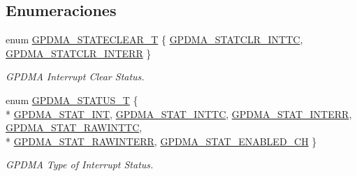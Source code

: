 \subsection*{Enumeraciones}
\begin{DoxyCompactItemize}
\item 
enum \hyperlink{group___g_p_d_m_a__18_x_x__43_x_x_gabbb281ef4b818f2e60167cf766f94fdb}{G\+P\+D\+M\+A\+\_\+\+S\+T\+A\+T\+E\+C\+L\+E\+A\+R\+\_\+T} \{ \hyperlink{group___g_p_d_m_a__18_x_x__43_x_x_ggabbb281ef4b818f2e60167cf766f94fdba9a0c8256eb0f656d56f065914219c96c}{G\+P\+D\+M\+A\+\_\+\+S\+T\+A\+T\+C\+L\+R\+\_\+\+I\+N\+T\+TC}, 
\hyperlink{group___g_p_d_m_a__18_x_x__43_x_x_ggabbb281ef4b818f2e60167cf766f94fdbaf6e975b9dfa7d659d18a377c7873b92a}{G\+P\+D\+M\+A\+\_\+\+S\+T\+A\+T\+C\+L\+R\+\_\+\+I\+N\+T\+E\+RR}
 \}\begin{DoxyCompactList}\small\item\em G\+P\+D\+MA Interrupt Clear Status. \end{DoxyCompactList}
\item 
enum \hyperlink{group___g_p_d_m_a__18_x_x__43_x_x_ga2f4aa97bd0ffa5046c8e2b17028d99cc}{G\+P\+D\+M\+A\+\_\+\+S\+T\+A\+T\+U\+S\+\_\+T} \{ \\*
\hyperlink{group___g_p_d_m_a__18_x_x__43_x_x_gga2f4aa97bd0ffa5046c8e2b17028d99ccaf89b610470a940617af6bef4f4451aa9}{G\+P\+D\+M\+A\+\_\+\+S\+T\+A\+T\+\_\+\+I\+NT}, 
\hyperlink{group___g_p_d_m_a__18_x_x__43_x_x_gga2f4aa97bd0ffa5046c8e2b17028d99ccac093908914ed40148e81169fc15df2f7}{G\+P\+D\+M\+A\+\_\+\+S\+T\+A\+T\+\_\+\+I\+N\+T\+TC}, 
\hyperlink{group___g_p_d_m_a__18_x_x__43_x_x_gga2f4aa97bd0ffa5046c8e2b17028d99ccaee7927c433e007f270c365bcca865706}{G\+P\+D\+M\+A\+\_\+\+S\+T\+A\+T\+\_\+\+I\+N\+T\+E\+RR}, 
\hyperlink{group___g_p_d_m_a__18_x_x__43_x_x_gga2f4aa97bd0ffa5046c8e2b17028d99cca4a74b1bc907fbbdbf9dfb05222f0b513}{G\+P\+D\+M\+A\+\_\+\+S\+T\+A\+T\+\_\+\+R\+A\+W\+I\+N\+T\+TC}, 
\\*
\hyperlink{group___g_p_d_m_a__18_x_x__43_x_x_gga2f4aa97bd0ffa5046c8e2b17028d99ccad547775dc5510034932bf1597931e899}{G\+P\+D\+M\+A\+\_\+\+S\+T\+A\+T\+\_\+\+R\+A\+W\+I\+N\+T\+E\+RR}, 
\hyperlink{group___g_p_d_m_a__18_x_x__43_x_x_gga2f4aa97bd0ffa5046c8e2b17028d99cca711d88f645a203338f297a286b912767}{G\+P\+D\+M\+A\+\_\+\+S\+T\+A\+T\+\_\+\+E\+N\+A\+B\+L\+E\+D\+\_\+\+CH}
 \}\begin{DoxyCompactList}\small\item\em G\+P\+D\+MA Type of Interrupt Status. \end{DoxyCompactList}
\item 

\end{DoxyCompactItemize}
